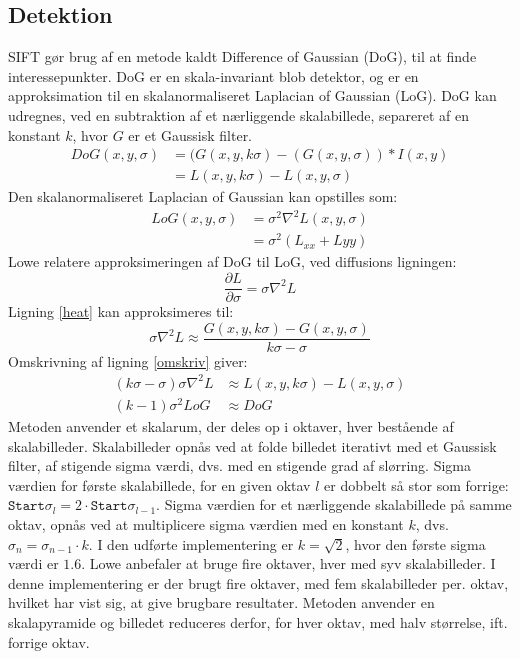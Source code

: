 \subsection{Detektion}
SIFT gør brug af en metode kaldt Difference of Gaussian (DoG), til at finde interessepunkter. DoG er en skala-invariant blob detektor, og er en approksimation til en skalanormaliseret Laplacian of Gaussian (LoG). DoG kan udregnes, ved en subtraktion af et nærliggende skalabillede, separeret af en konstant $k$, hvor $G$ er et Gaussisk filter.
\begin{equation}
\begin{split}
DoG(x,y,\sigma) &= (G(x,y,k\sigma)-(G(x,y,\sigma))\ast I(x,y) \\
           &= L(x,y,k \sigma)-L(x,y,\sigma)
\end{split}
\label{dog}
\end{equation}
Den skalanormaliseret Laplacian of Gaussian kan opstilles som:
\begin{equation}
\begin{split}
LoG(x,y,\sigma)&=\sigma^2\nabla^2L(x,y,\sigma) \\
&= \sigma^2(L_{xx}+L{yy})
\end{split}
\end{equation}
Lowe relatere approksimeringen af DoG til LoG, ved diffusions ligningen:
\begin{equation}
\dfrac{\partial L}{\partial \sigma} = \sigma \nabla^2L
\label{heat}
\end{equation}
Ligning \eqref{heat} kan approksimeres til:
\begin{equation}
\sigma \nabla^2L \approx \frac{G(x,y,k\sigma) - G(x,y,\sigma)}{k\sigma-\sigma}
\label{omskriv}
\end{equation}
Omskrivning af ligning \eqref{omskriv} giver:
\begin{equation}
\begin{split}
(k\sigma-\sigma)\sigma\nabla^2L &\approx L(x,y,k\sigma)-L(x,y,\sigma) \\
(k-1)\sigma^2LoG &\approx DoG
\end{split}
\end{equation}
Metoden anvender et skalarum, der deles op i oktaver, hver bestående af skalabilleder. Skalabilleder opnås ved at folde billedet iterativt med et Gaussisk filter, af stigende sigma værdi, dvs. med en stigende grad af slørring. Sigma værdien for første skalabillede, for en given oktav $l$ er dobbelt så stor som forrige: $\texttt{Start} \sigma_l = 2 \cdot \texttt{Start} \sigma_{l-1}$. Sigma værdien for et nærliggende skalabillede på samme oktav, opnås ved at multiplicere sigma værdien med en konstant $k$, dvs. $\sigma_n = \sigma_{n-1} \cdot k$. I den udførte implementering er $k=\sqrt{2}$, hvor den første sigma værdi er $1.6$. Lowe anbefaler at bruge fire oktaver, hver med syv skalabilleder. I denne implementering er der brugt fire oktaver, med fem skalabilleder per. oktav, hvilket har vist sig, at give brugbare resultater. Metoden anvender en skalapyramide og billedet reduceres derfor, for hver oktav, med halv størrelse, ift. forrige oktav. \\ 
